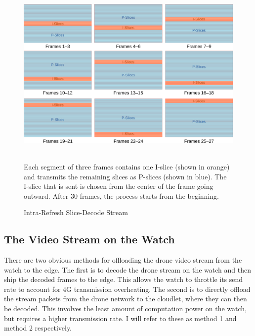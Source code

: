\begin{figure}
    \centering
    \includegraphics[width=0.9\linewidth]{chapter3/FIGS/slice-encoding-crop.pdf}
    \begin{captext}
    \\[0.1cm] \small Each segment of three frames contains one I-slice (shown in orange) and transmits the remaining slices as P-slices (shown in blue). The I-slice that is sent is chosen from the center of the frame going outward. After 30 frames, the process starts from the beginning.
    \end{captext}
    \caption{Intra-Refresh Slice-Decode Stream}
    \label{fig:slice-encoding}
\end{figure}

\subsection{The Video Stream on the Watch}
There are two obvious methods for offloading the drone video stream from the watch to the edge. The first is to decode the drone stream on the watch and then ship the decoded frames to the edge. This allows the watch to throttle its send rate to account for 4G transmission overheating. The second is to directly offload the stream packets from the drone network to the cloudlet, where they can then be decoded. This involves the least amount of computation power on the watch, but requires a higher transmission rate. I will refer to these as method 1 and method 2 respectively.

